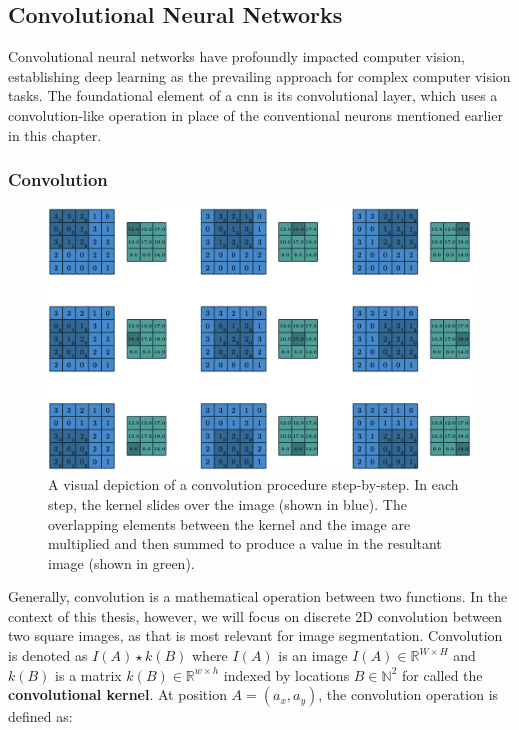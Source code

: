 \subsection{Convolutional Neural Networks}

Convolutional neural networks have profoundly impacted computer vision, establishing deep learning as the prevailing approach for complex computer vision tasks. The foundational element of a \ac{cnn} is its convolutional layer, which uses a convolution-like operation in place of the conventional neurons mentioned earlier in this chapter.

\subsubsection{Convolution}

\begin{figure}[h!]
 \centering
 \includegraphics[width=\linewidth]{images/convolution-explainer.png}
 \caption{A visual depiction of a convolution procedure step-by-step. In each step, the kernel slides over the image (shown in blue). The overlapping elements between the kernel and the image are multiplied and then summed to produce a value in the resultant image (shown in green). \cite{dumoulinGuideConvolutionArithmetic2018}}
 \label{fig:convolution-explanation}
 \end{figure}

Generally, convolution is a mathematical operation between two functions. In the context of this thesis, however, we will focus on discrete 2D convolution between two square images, as that is most relevant for image segmentation. Convolution is denoted as $I(A) \star k(B)$ where $I(A)$ is an image $I(A) \in \mathbb{R}^{W \times H}$ and $k(B)$ is a matrix $k(B) \in \mathbb{R}^{w \times h}$ indexed by locations $B \in \mathbb{N}^2$ for called the \textbf{convolutional kernel}. At position $A = (a_x, a_y)$, the convolution operation is defined as:

